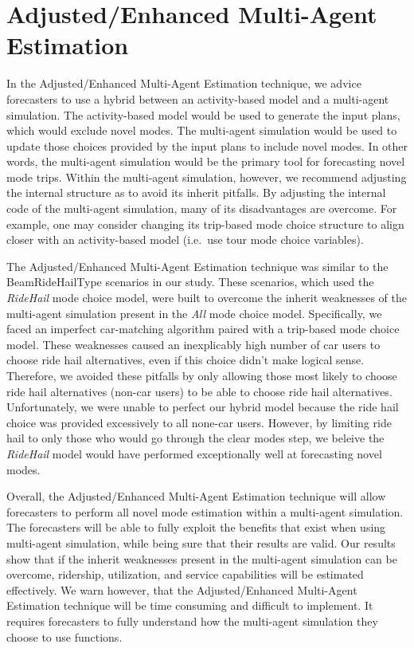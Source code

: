 \documentclass[fancy, masters]{byuthesis}
\begin{document}
\hypertarget{adjustedenhanced-multi-agent-estimation}{%
\section{Adjusted/Enhanced Multi-Agent Estimation}\label{adjustedenhanced-multi-agent-estimation}}

In the Adjusted/Enhanced Multi-Agent Estimation technique, we advice forecasters to use a hybrid between an activity-based model and a multi-agent simulation. The activity-based model would be used to generate the input plans, which would exclude novel modes. The multi-agent simulation would be used to update those choices provided by the input plans to include novel modes. In other words, the multi-agent simulation would be the primary tool for forecasting novel mode trips. Within the multi-agent simulation, however, we recommend adjusting the internal structure as to avoid its inherit pitfalls. By adjusting the internal code of the multi-agent simulation, many of its disadvantages are overcome. For example, one may consider changing its trip-based mode choice structure to align closer with an activity-based model (i.e.~use tour mode choice variables).

The Adjusted/Enhanced Multi-Agent Estimation technique was similar to the BeamRideHailType scenarios in our study. These scenarios, which used the \emph{RideHail} mode choice model, were built to overcome the inherit weaknesses of the multi-agent simulation present in the \emph{All} mode choice model. Specifically, we faced an imperfect car-matching algorithm paired with a trip-based mode choice model. These weaknesses caused an inexplicably high number of car users to choose ride hail alternatives, even if this choice didn't make logical sense. Therefore, we avoided these pitfalls by only allowing those most likely to choose ride hail alternatives (non-car users) to be able to choose ride hail alternatives. Unfortunately, we were unable to perfect our hybrid model because the ride hail choice was provided excessively to all none-car users. However, by limiting ride hail to only those who would go through the clear modes step, we beleive the \emph{RideHail} model would have performed exceptionally well at forecasting novel modes.

Overall, the Adjusted/Enhanced Multi-Agent Estimation technique will allow forecasters to perform all novel mode estimation within a multi-agent simulation. The forecasters will be able to fully exploit the benefits that exist when using multi-agent simulation, while being sure that their results are valid. Our results show that if the inherit weaknesses present in the multi-agent simulation can be overcome, ridership, utilization, and service capabilities will be estimated effectively. We warn however, that the Adjusted/Enhanced Multi-Agent Estimation technique will be time consuming and difficult to implement. It requires forecasters to fully understand how the multi-agent simulation they choose to use functions.
\end{document}
